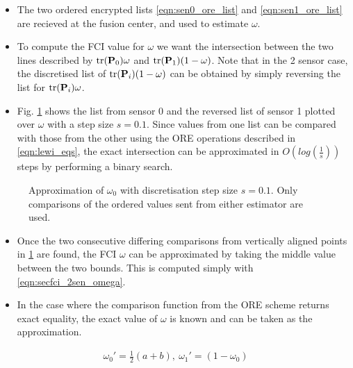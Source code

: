 \documentclass[letterpaper, 10 pt, conference]{ieeeconf}  %
\begin{document}
\begin{itemize}
   \item The two ordered encrypted lists \eqref{eqn:sen0_ore_list} and \eqref{eqn:sen1_ore_list} are recieved at the fusion center, and used to estimate $\omega$.
   \item To compute the FCI value for $\omega$ we want the intersection between the two lines described by $\operatorname{tr}({{\mathbf{P}}}_0)\omega$ and $\operatorname{tr}({{\mathbf{P}}}_1)(1-\omega)$. Note that in the 2 sensor case, the discretised list of $\operatorname{tr}({{\mathbf{P}}}_i)(1-\omega)$ can be obtained by simply reversing the list for $\operatorname{tr}({{\mathbf{P}}}_i)\omega$.
   \item Fig. \ref{fig:2_sensor_sol} shows the list from sensor 0 and the reversed list of sensor 1 plotted over $\omega$ with a step size $s=0.1$. Since values from one list can be compared with those from the other using the ORE operations described in \eqref{eqn:lewi_eqs}, the exact intersection can be approximated in $O(log(\frac{1}{s}))$ steps by performing a binary search.
\end{itemize}
\begin{figure}[tb]
   \begin{center}
      
   \end{center}
   \caption{Approximation of $\omega_0$ with discretisation step size $s=0.1$. Only comparisons of the ordered values sent from either estimator are used.}
   \label{fig:2_sensor_sol}
\end{figure}
\begin{itemize}
   \item Once the two consecutive differing comparisons from vertically aligned points in \ref{fig:2_sensor_sol} are found, the FCI $\omega$ can be approximated by taking the middle value between the two bounds. This is computed simply with \eqref{eqn:secfci_2sen_omega}.
   \item In the case where the comparison function from the ORE scheme returns exact equality, the exact value of $\omega$ is known and can be taken as the approximation.
\end{itemize}
\begin{gather}
   \omega_0'=\frac{1}{2}(a + b),\ \omega_1' = (1-\omega_0) \label{eqn:secfci_2sen_omega}
\end{gather}
\end{document}

